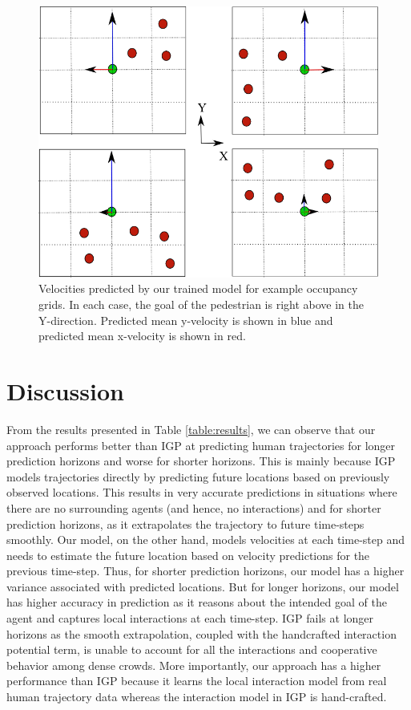 \begin{figure}[t!]
  \centering
  \includegraphics[width=0.7\linewidth]{Figures/sample-ogrid.png}
  \caption{Velocities predicted by our trained model for example occupancy grids. In each case, the goal of the pedestrian is right above in the Y-direction. Predicted mean y-velocity is shown in blue and predicted mean x-velocity is shown in red.}
  \label{fig:learnedmodel}
  \vspace{-15pt}
\end{figure}

\section{Discussion}
\label{sec:discussion}

From the results presented in Table \ref{table:results}, we can
observe that our approach performs better than IGP at predicting human
trajectories for longer prediction horizons and worse for shorter
horizons. This is mainly because IGP models trajectories directly by
predicting future locations based on previously observed locations. This
results in very accurate predictions in situations where there are no
surrounding agents (and hence, no interactions) and for shorter
prediction horizons, as it extrapolates the trajectory to future
time-steps smoothly. Our model, on the other hand, models velocities
at each time-step and needs to estimate the future location based on
velocity predictions for the previous time-step. Thus, for shorter
prediction horizons, our model has a higher variance associated with
predicted locations. But for longer horizons, our model has higher
accuracy in prediction as it reasons about the intended goal of the
agent and captures local interactions at each time-step. IGP fails at
longer horizons as the smooth extrapolation, coupled with the
handcrafted interaction potential term, is unable to account for all
the interactions and cooperative behavior among dense crowds. More
importantly, our approach has a higher performance than IGP because it
learns the local interaction model from real human trajectory data
whereas the interaction model in IGP is hand-crafted.

